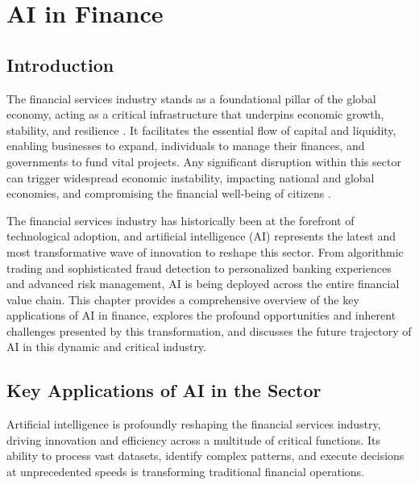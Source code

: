 \chapter{AI in Finance}
\label{cha:ai_in_finance}

\section{Introduction}

The financial services industry stands as a foundational pillar of the global economy, acting as a critical infrastructure that underpins economic growth, stability, and resilience \cite{Investopedia_Critical, CISA_Financial}. It facilitates the essential flow of capital and liquidity, enabling businesses to expand, individuals to manage their finances, and governments to fund vital projects. Any significant disruption within this sector can trigger widespread economic instability, impacting national and global economies, and compromising the financial well-being of citizens \cite{Investopedia_Critical_2}.

The financial services industry has historically been at the forefront of technological adoption, and artificial intelligence (AI) represents the latest and most transformative wave of innovation to reshape this sector. From algorithmic trading and sophisticated fraud detection to personalized banking experiences and advanced risk management, AI is being deployed across the entire financial value chain. This chapter provides a comprehensive overview of the key applications of AI in finance, explores the profound opportunities and inherent challenges presented by this transformation, and discusses the future trajectory of AI in this dynamic and critical industry.

\section{Key Applications of AI in the Sector}

Artificial intelligence is profoundly reshaping the financial services industry, driving innovation and efficiency across a multitude of critical functions. Its ability to process vast datasets, identify complex patterns, and execute decisions at unprecedented speeds is transforming traditional financial operations.


